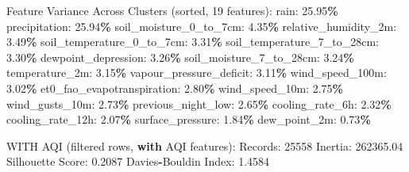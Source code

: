 \documentclass[
  letterpaper,
  DIV=11,
  numbers=noendperiod]{scrartcl}
\newenvironment{Shaded}{\begin{snugshade}}{\end{snugshade}}
\newcommand{\BuiltInTok}[1]{#1}
\newcommand{\ControlFlowTok}[1]{\textcolor[rgb]{0.13,0.29,0.53}{\textbf{#1}}}
\newcommand{\DecValTok}[1]{\textcolor[rgb]{0.00,0.00,0.81}{#1}}
\newcommand{\FloatTok}[1]{\textcolor[rgb]{0.00,0.00,0.81}{#1}}
\newcommand{\NormalTok}[1]{#1}
\newcommand{\OperatorTok}[1]{\textcolor[rgb]{0.81,0.36,0.00}{\textbf{#1}}}
\begin{document}
\begin{Shaded}
\begin{Highlighting}[]
\NormalTok{  Feature Variance Across Clusters (}\BuiltInTok{sorted}\NormalTok{, }\DecValTok{19}\NormalTok{ features):}
\NormalTok{    rain: }\FloatTok{25.95}\OperatorTok{\%}
\NormalTok{    precipitation: }\FloatTok{25.94}\OperatorTok{\%}
\NormalTok{    soil\_moisture\_0\_to\_7cm: }\FloatTok{4.35}\OperatorTok{\%}
\NormalTok{    relative\_humidity\_2m: }\FloatTok{3.49}\OperatorTok{\%}
\NormalTok{    soil\_temperature\_0\_to\_7cm: }\FloatTok{3.31}\OperatorTok{\%}
\NormalTok{    soil\_temperature\_7\_to\_28cm: }\FloatTok{3.30}\OperatorTok{\%}
\NormalTok{    dewpoint\_depression: }\FloatTok{3.26}\OperatorTok{\%}
\NormalTok{    soil\_moisture\_7\_to\_28cm: }\FloatTok{3.24}\OperatorTok{\%}
\NormalTok{    temperature\_2m: }\FloatTok{3.15}\OperatorTok{\%}
\NormalTok{    vapour\_pressure\_deficit: }\FloatTok{3.11}\OperatorTok{\%}
\NormalTok{    wind\_speed\_100m: }\FloatTok{3.02}\OperatorTok{\%}
\NormalTok{    et0\_fao\_evapotranspiration: }\FloatTok{2.80}\OperatorTok{\%}
\NormalTok{    wind\_speed\_10m: }\FloatTok{2.75}\OperatorTok{\%}
\NormalTok{    wind\_gusts\_10m: }\FloatTok{2.73}\OperatorTok{\%}
\NormalTok{    previous\_night\_low: }\FloatTok{2.65}\OperatorTok{\%}
\NormalTok{    cooling\_rate\_6h: }\FloatTok{2.32}\OperatorTok{\%}
\NormalTok{    cooling\_rate\_12h: }\FloatTok{2.07}\OperatorTok{\%}
\NormalTok{    surface\_pressure: }\FloatTok{1.84}\OperatorTok{\%}
\NormalTok{    dew\_point\_2m: }\FloatTok{0.73}\OperatorTok{\%}

\NormalTok{WITH AQI (filtered rows, }\ControlFlowTok{with}\NormalTok{ AQI features):}
\NormalTok{  Records: }\DecValTok{25558}
\NormalTok{  Inertia: }\FloatTok{262365.04}
\NormalTok{  Silhouette Score: }\FloatTok{0.2087}
\NormalTok{  Davies}\OperatorTok{{-}}\NormalTok{Bouldin Index: }\FloatTok{1.4584}


\end{Highlighting}
\end{Shaded}
\end{document}
